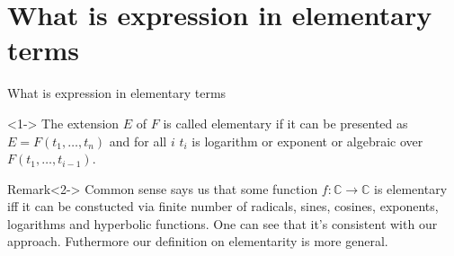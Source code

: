 \documentclass[8pt]{beamer}
\renewcommand{\C}{\ensuremath{\mathbb{C}}}
\renewcommand{\|}{\ensuremath{\hspace{0.1cm} | \hspace{0.1cm}}}
\begin{document}
    \section{What is expression in elementary terms}
    \begin{frame}{What is expression in elementary terms}
        \begin{definition}<1->
            The extension $E$ of $F$ is called elementary if it can be presented as $E = F(t_1, \ldots, t_n)$ and for all $i$ $t_i$ is logarithm or exponent or algebraic over $F(t_1, \ldots, t_{i-1})$.
        \end{definition}
        \begin{block}{Remark}<2->
            Common sense says us that some function $f: \C \to \C$ is elementary iff it can be constucted via finite number of radicals, sines, cosines, exponents, logarithms and hyperbolic functions.
            One can see that it's consistent with our approach. Futhermore our definition on elementarity is more general.
        \end{block}
    \end{frame}
\end{document}
